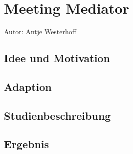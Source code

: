 \section{Meeting Mediator}
Autor: Antje Westerhoff

\subsection{Idee und Motivation}


\subsection{Adaption}


\subsection{Studienbeschreibung}


\subsection{Ergebnis}
